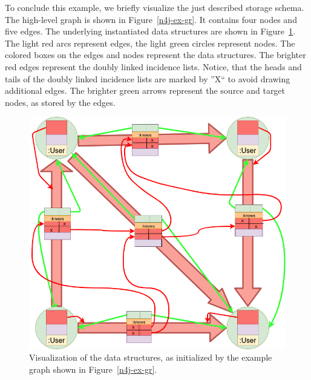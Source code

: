             To conclude this example, we briefly visualize the just described storage schema. 
            The high-level graph is shown in Figure~\ref{n4j-ex-gr}.
            It contains four nodes and five edges.
            The underlying instantiated data structures are shown in Figure~\ref{n4j-ex}.
            The light red arcs represent edges, the light green circles represent nodes.
            The colored boxes on the edges and nodes represent the data structures.
            The brighter red edges represent the doubly linked incidence lists.
            Notice, that the heads and tails of the doubly linked incidence lists are marked by ''X`` to avoid drawing additional edges.
            The brighter green arrows represent the source and target nodes, as stored by the edges.
            \vfill
            \begin{figure}[htp]
                \begin{center}
                    \includegraphics[keepaspectratio,height=\textheight,width=\textwidth]{img/04-databases/example_structs.png}
                \end{center}
                \caption{Visualization of the data structures, as initialized by the example graph shown in Figure~\ref{n4j-ex-gr}.}
                \label{n4j-ex}
            \end{figure}
            \vfill
